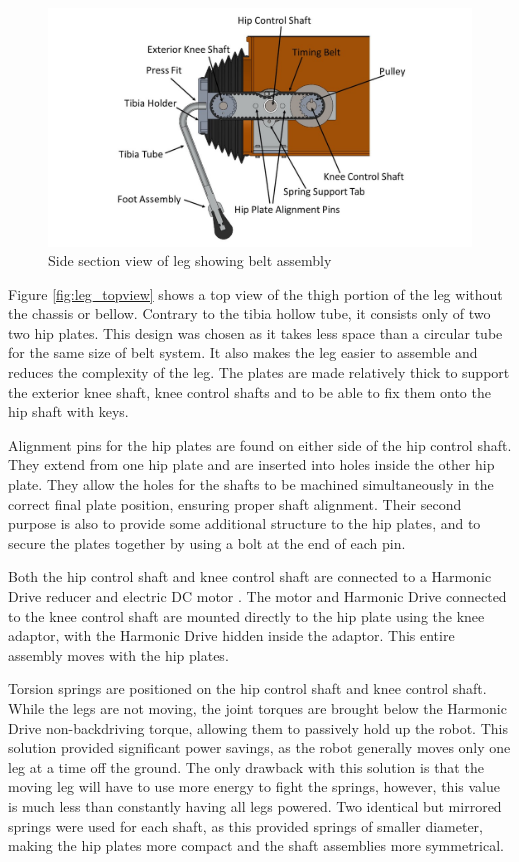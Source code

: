 \begin{figure}
    \centering
    \includegraphics[width=\textwidth]{2_ProposedDesign/img/LegSectionWithBellowA.jpg}
    \caption{Side section view of leg showing belt assembly}
    \label{fig:leg_sideview}
\end{figure}

Figure \ref{fig:leg_topview} shows a top view of the thigh portion of the leg without the chassis or bellow. Contrary to the tibia hollow tube, it consists only of two two hip plates. This design was chosen as it takes less space than a circular tube for the same size of belt system. It also makes the leg easier to assemble and reduces the complexity of the leg. The plates are made relatively thick to support the exterior knee shaft, knee control shafts and to be able to fix them onto the hip shaft with keys.

Alignment pins for the hip plates are found on either side of the hip control shaft. They extend from one hip plate and are inserted into holes inside the other hip plate. They allow the holes for the shafts to be machined simultaneously in the correct final plate position, ensuring proper shaft alignment. Their second purpose is also to provide some additional structure to the hip plates, and to secure the plates together by using a bolt at the end of each pin.

Both the hip control shaft and knee control shaft are connected to a Harmonic Drive reducer and electric DC motor \cite{harmonic_drive_csd-2a_2019} \cite{maxon_motor_maxon_2014}. The motor and Harmonic Drive connected to the knee control shaft are mounted directly to the hip plate using the knee adaptor, with the Harmonic Drive hidden inside the adaptor. This entire assembly moves with the hip plates.

Torsion springs are positioned on the hip control shaft and knee control shaft. While the legs are not moving, the joint torques are brought below the Harmonic Drive non-backdriving torque, allowing them to passively hold up the robot. This solution provided significant power savings, as the robot generally moves only one leg at a time off the ground. The only drawback with this solution is that the moving leg will have to use more energy to fight the springs, however, this value is much less than constantly having all legs powered. Two identical but mirrored springs were used for each shaft, as this provided springs of smaller diameter, making the hip plates more compact and the shaft assemblies more symmetrical. 

